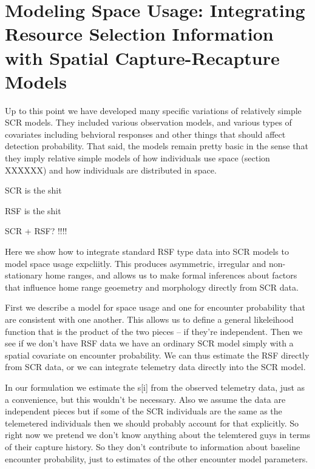 \chapter{
Modeling Space Usage: 
Integrating Resource Selection Information with 
Spatial Capture-Recapture
  Models}

\label{chapt.rsf}


\vspace{.3in}

Up to this point we have developed many specific variations of
relatively simple SCR models. They included various observation
models, and various types of covariates including behvioral responses
and other things that should affect detection probability.
That said, the models remain pretty basic in the sense that they imply
relative simple models of how individuals use space (section XXXXXX) and how
individuals are distributed in space.

SCR is the shit

RSF is the shit

SCR + RSF? !!!!

Here we show how to integrate standard RSF type data into SCR models
to model space usage expcliitly. This produces asymmetric, irregular
and non-stationary home ranges, and allows us to make formal
inferences about factors that influence home range geoemetry and
morphology directly from SCR data.

First we describe a model for space usage and one for encounter
probability that are consistent with one another.
This allows us to define a general likeleihood function that is the
product of the two pieces -- if they're independent. 
Then we see if we don't have RSF data we have an ordinary SCR model
simply with a spatial covariate on encounter probability. We can thus
estimate the RSF directly from SCR data, or we can integrate telemetry
data directly into the SCR model. 

In our formulation we estimate the s[i] from the observed telemetry
data, just as a convenience, but this wouldn't be necessary.
Also we assume the data are independent pieces but if some of the SCR
individuals are the same as the telemetered individuals then we should
probably account for that explicitly. So right now we pretend we don't
know anything about the telemtered guys in terms of their capture
history. So they don't contribute to information about baseline
encounter probability, just to estimates of the other encounter model
parameters. 



